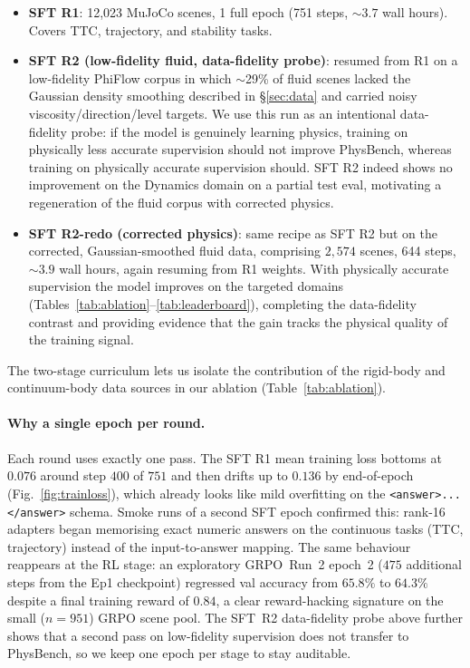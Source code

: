 \documentclass{article}
\begin{document}
\begin{itemize}\itemsep0.05em
  \item \textbf{SFT R1}: 12{,}023 MuJoCo scenes, 1 full epoch
        (751 steps, $\sim 3.7$ wall hours). Covers TTC,
        trajectory, and stability tasks.
  \item \textbf{SFT R2 (low-fidelity fluid, data-fidelity probe)}:
        resumed from R1 on a low-fidelity PhiFlow corpus in which
        $\sim$29\% of fluid scenes lacked the Gaussian density
        smoothing described in \S\ref{sec:data} and carried noisy
        viscosity/direction/level targets. We use this run as an
        intentional data-fidelity probe: if the model is genuinely
        learning physics, training on physically less accurate
        supervision should not improve PhysBench, whereas training on
        physically accurate supervision should. SFT R2 indeed shows
        no improvement on the Dynamics domain on a partial test eval,
        motivating a regeneration of the fluid corpus with corrected
        physics.
  \item \textbf{SFT R2-redo (corrected physics)}: same recipe as SFT
        R2 but on the corrected, Gaussian-smoothed fluid data,
        comprising $2{,}574$ scenes, 644 steps, $\sim 3.9$ wall
        hours, again resuming from R1 weights. With physically
        accurate supervision the model improves on the targeted
        domains (Tables~\ref{tab:ablation}--\ref{tab:leaderboard}),
        completing the data-fidelity contrast and providing evidence
        that the gain tracks the physical quality of the training
        signal.
\end{itemize}

The two-stage curriculum lets us isolate the contribution of the rigid-body
and continuum-body data sources in our ablation
(Table~\ref{tab:ablation}).

\paragraph{Why a single epoch per round.} Each round uses exactly
one pass. The SFT R1 mean training loss bottoms at $0.076$ around
step $400$ of $751$ and then drifts up to $0.136$ by end-of-epoch
(Fig.~\ref{fig:trainloss}), which already looks like mild
overfitting on the \texttt{<answer>...</answer>} schema. Smoke
runs of a second SFT epoch confirmed this: rank-16 adapters began
memorising exact numeric answers on the continuous tasks (TTC,
trajectory) instead of the input-to-answer mapping. The same
behaviour reappears at the RL stage: an exploratory GRPO~Run~2
epoch~2 ($475$ additional steps from the Ep1 checkpoint) regressed
val accuracy from $65.8\%$ to $64.3\%$ despite a final training
reward of $0.84$, a clear reward-hacking signature on the small
($n{=}951$) GRPO scene pool. The SFT~R2 data-fidelity probe above
further shows that a second pass on low-fidelity supervision does
not transfer to PhysBench, so we keep one epoch per stage to stay
auditable.
\end{document}
